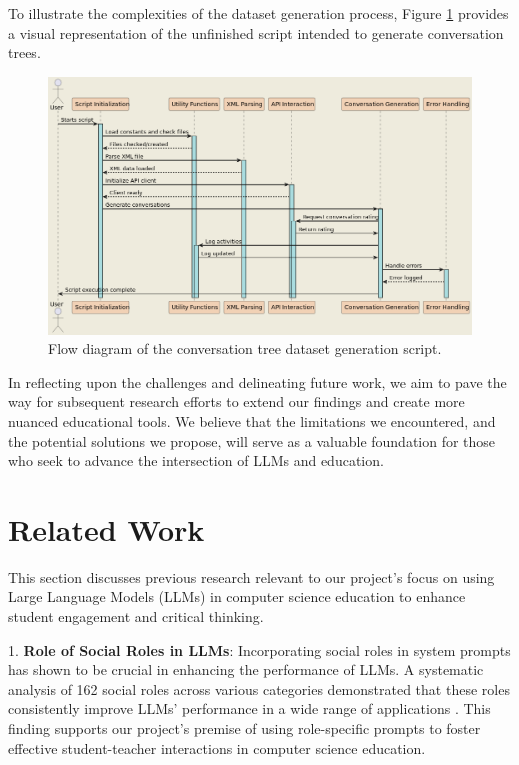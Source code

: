 \documentclass[]{article}
\begin{document}
To illustrate the complexities of the dataset generation process, Figure \ref{fig:conversation_tree_generation} provides a visual representation of the unfinished script intended to generate conversation trees.

\begin{figure}[h!]
    \centering
    \includegraphics[width=\textwidth]{diagram.png}
    \caption{Flow diagram of the conversation tree dataset generation script.}
    \label{fig:conversation_tree_generation}
\end{figure}

In reflecting upon the challenges and delineating future work, we aim to pave the way for subsequent research efforts to extend our findings and create more nuanced educational tools. We believe that the limitations we encountered, and the potential solutions we propose, will serve as a valuable foundation for those who seek to advance the intersection of LLMs and education.

\section{Related Work}

This section discusses previous research relevant to our project's focus on using Large Language Models (LLMs) in computer science education to enhance student engagement and critical thinking.

1. \textbf{Role of Social Roles in LLMs}: Incorporating social roles in system prompts has shown to be crucial in enhancing the performance of LLMs. A systematic analysis of 162 social roles across various categories demonstrated that these roles consistently improve LLMs' performance in a wide range of applications \cite{Mingqian}. This finding supports our project's premise of using role-specific prompts to foster effective student-teacher interactions in computer science education.
\end{document}

